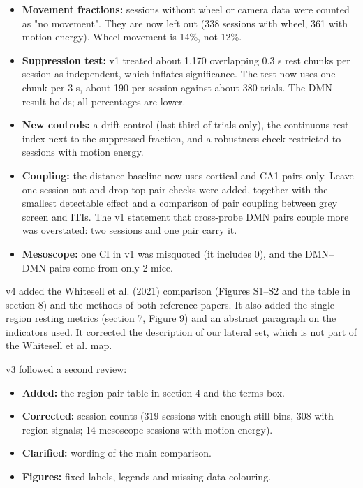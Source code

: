 \documentclass[10pt,a4paper]{article}
\begin{document}
\begin{tcolorbox}[breakable,colback=accent!8,colframe=accent,boxrule=0pt,leftrule=2pt,arc=0pt,fontupper=\small]
\begin{itemize}
\item \textbf{Movement fractions:} sessions without wheel or camera data were counted as "no movement". They are now left out (338 sessions with wheel, 361 with motion energy). Wheel movement is 14\%, not 12\%.
\item \textbf{Suppression test:} v1 treated about 1,170 overlapping 0.3 s rest chunks per session as independent, which inflates significance. The test now uses one chunk per 3 s, about 190 per session against about 380 trials. The DMN result holds; all percentages are lower.
\item \textbf{New controls:} a drift control (last third of trials only), the continuous rest index next to the suppressed fraction, and a robustness check restricted to sessions with motion energy.
\item \textbf{Coupling:} the distance baseline now uses cortical and CA1 pairs only. Leave-one-session-out and drop-top-pair checks were added, together with the smallest detectable effect and a comparison of pair coupling between grey screen and ITIs. The v1 statement that cross-probe DMN pairs couple more was overstated: two sessions and one pair carry it.
\item \textbf{Mesoscope:} one CI in v1 was misquoted (it includes 0), and the DMN--DMN pairs come from only 2 mice.
\end{itemize}
v4 added the Whitesell et al. (2021) comparison (Figures S1--S2 and the table in section 8) and the methods of both reference papers. It also added the single-region resting metrics (section 7, Figure 9) and an abstract paragraph on the indicators used. It corrected the description of our lateral set, which is not part of the Whitesell et al. map.

v3 followed a second review:

\begin{itemize}
\item \textbf{Added:} the region-pair table in section 4 and the terms box.
\item \textbf{Corrected:} session counts (319 sessions with enough still bins, 308 with region signals; 14 mesoscope sessions with motion energy).
\item \textbf{Clarified:} wording of the main comparison.
\item \textbf{Figures:} fixed labels, legends and missing-data colouring.
\end{itemize}
\end{tcolorbox}
\end{document}
